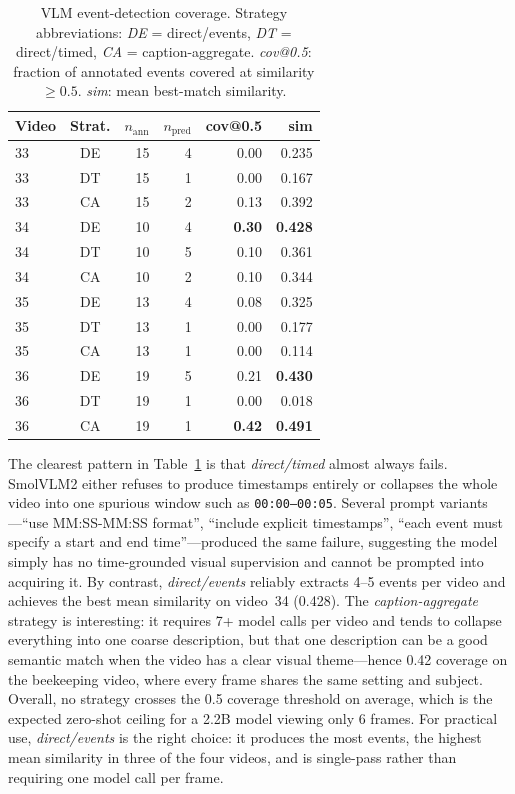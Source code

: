 \documentclass[sigconf, nonacm]{acmart}
\begin{document}
\begin{table}[h]
  \centering
  \caption{VLM event-detection coverage. Strategy abbreviations:
           \emph{DE} = direct/events, \emph{DT} = direct/timed,
           \emph{CA} = caption-aggregate.
           \emph{cov@0.5}: fraction of annotated events covered at
           similarity $\geq 0.5$. \emph{sim}: mean best-match similarity.}
  \label{tab:coverage}
  \setlength{\tabcolsep}{4pt}
  \begin{tabular}{lcrrrr}
    \toprule
    Video & Strat. & $n_\text{ann}$ & $n_\text{pred}$ & cov@0.5 & sim \\
    \midrule
    33 & DE & 15 & 4 & 0.00          & 0.235 \\
    33 & DT & 15 & 1 & 0.00          & 0.167 \\
    33 & CA & 15 & 2 & 0.13          & 0.392 \\
    \midrule
    34 & DE & 10 & 4 & \textbf{0.30} & \textbf{0.428} \\
    34 & DT & 10 & 5 & 0.10          & 0.361 \\
    34 & CA & 10 & 2 & 0.10          & 0.344 \\
    \midrule
    35 & DE & 13 & 4 & 0.08          & 0.325 \\
    35 & DT & 13 & 1 & 0.00          & 0.177 \\
    35 & CA & 13 & 1 & 0.00          & 0.114 \\
    \midrule
    36 & DE & 19 & 5 & 0.21          & \textbf{0.430} \\
    36 & DT & 19 & 1 & 0.00          & 0.018 \\
    36 & CA & 19 & 1 & \textbf{0.42} & \textbf{0.491} \\
    \bottomrule
  \end{tabular}
\end{table}

The clearest pattern in Table~\ref{tab:coverage} is that
\textit{direct/timed} almost always fails. SmolVLM2 either refuses to
produce timestamps entirely or collapses the whole video into one spurious
window such as \texttt{00:00--00:05}. Several prompt variants---``use
MM:SS-MM:SS format'', ``include explicit timestamps'', ``each event must
specify a start and end time''---produced the same failure, suggesting the
model simply has no time-grounded visual supervision and cannot be prompted
into acquiring it. By contrast, \textit{direct/events} reliably extracts
4--5 events per video and achieves the best mean similarity on video~34
(0.428). The \textit{caption-aggregate} strategy is interesting: it
requires 7+ model calls per video and tends to collapse everything into one
coarse description, but that one description can be a good semantic match
when the video has a clear visual theme---hence 0.42 coverage on the
beekeeping video, where every frame shares the same setting and subject.
Overall, no strategy crosses the 0.5 coverage threshold on average, which
is the expected zero-shot ceiling for a 2.2B model viewing only 6 frames.
For practical use, \textit{direct/events} is the right choice: it produces
the most events, the highest mean similarity in three of the four videos,
and is single-pass rather than requiring one model call per frame.
\end{document}
